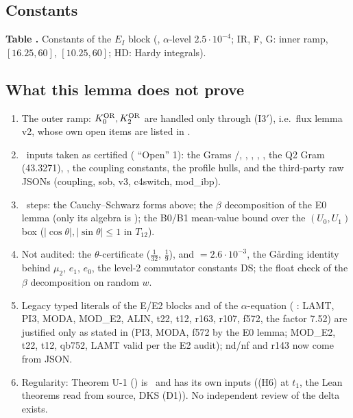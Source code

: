 \documentclass[11pt]{article}
\begin{document}
\subsection{Constants}\label{EI:sec:const}
\begin{center}\small\textbf{Table \thetable\label{EI:tab:const}.} Constants of the $E_I$ block (, $\alpha$-level $2.5\cdot10^{-4}$; IR, F, G: inner ramp, $[16.25,60]$, $[10.25,60]$; HD: Hardy integrals).\end{center}


\subsection{What this lemma does not prove}\label{EI:sec:open}
\begin{enumerate}[leftmargin=*]
\item The outer ramp: $K_0^{\mathrm{OR}},K_2^{\mathrm{OR}}$ are handled only through (I3$'$), i.e.\ flux lemma v2, whose own open items are listed in .
\item \tR\ inputs taken as certified ( ``Open'' 1): the Grams /, , , , , the Q2 Gram (43.3271), , the coupling constants, the profile hulls, and the third-party raw JSONs (coupling, sob, v3, c4switch, mod\_ibp).
\item \tHd\ steps: the Cauchy--Schwarz forms above; the $\beta$ decomposition of the E0 lemma (only its algebra is \tS); the B0/B1 mean-value bound over the $(U_0,U_1)$ box ($|\cos\theta|,|\sin\theta|\le1$ in $T_{12}$).
\item Not audited: the $\theta$-certificate ($\frac1{32}$, $\frac19$),  and  $=2.6\cdot10^{-3}$, the G\aa rding identity behind $\mu_2$, $e_1$, $e_0$, the level-2 commutator constants DS; the float check of the $\beta$ decomposition on random $w$.
\item Legacy typed literals of the E/E2 blocks and of the $\alpha$-equation ( : LAMT, PI3, MODA, MOD\_E2, ALIN, t22, t12, r163, r107, f572, the factor 7.52) are justified only as stated in  (PI3, MODA, f572 by the E0 lemma; MOD\_E2, t22, t12, qb752, LAMT valid per the E2 audit); nd/nf and r143 now come from JSON.
\item Regularity: Theorem U-1 () is \tHd\ and has its own inputs ((H6) at $t_1$, the Lean theorems read from source, DKS (D1)). No independent review of the  delta exists.
\end{enumerate}

\ifdefined\stepmain\else
\end{document}
